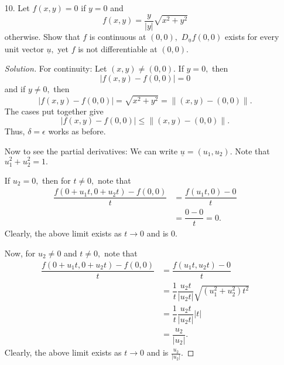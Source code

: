 \documentclass[12pt]{article}
\theoremstyle{definition}
\newenvironment{soln}{\begin{proof}[Solution]}{\end{proof}}
\begin{document}
\begin{itemize}
\begin{soln}
		The above can be written as
		\begin{equation*} 
			|f(x, y) - f(0, 0)| \le \|(x, y) - (0, 0)\|.
		\end{equation*}
		Thus, given any $\epsilon > 0,$ $\delta = \epsilon/\sqrt{2}$ works in the definition of continuity.

		Now, we show neither partial derivative exists. The calculations are similar and we show only the first. For $h \neq 0,$ we note that
		\begin{equation*} 
			\dfrac{f(h, 0) - f(0, 0)}{h} = \dfrac{h\sin(1/h)}{h} = \sin\left(\dfrac{1}{h}\right).
		\end{equation*}
		The limit of the above expression as $h \to 0$ does not exist. Thus, we are done.
	\end{soln}
	\newpage
	\item[10.] Let $f(x, y) = 0$ if $y = 0$ and
	\begin{equation*} 
		f(x, y) = \dfrac{y}{\left|y\right|}\sqrt{x^2 + y^2}
	\end{equation*}
	otherwise. Show that $f$ is continuous at $(0, 0),$ $D_{\underline{u}}f(0, 0)$ exists for every {\color{red}unit} vector $\underline{u},$ yet $f$ is not differentiable at $(0, 0).$
	\begin{soln}
		For continuity: Let $(x, y) \neq (0, 0).$ If $y = 0,$ then\begin{equation*} 
			|f(x, y) - f(0, 0)| = 0
		\end{equation*}
		and if $y \neq 0,$ then
		\begin{equation*} 
			|f(x, y) - f(0, 0)| = \sqrt{x^2 + y^2} = \|(x, y) - (0, 0)\|.
		\end{equation*}
		The cases put together give
		\begin{equation*} 
			|f(x, y) - f(0, 0)| \le \|(x, y) - (0, 0)\|.
		\end{equation*}
		Thus, $\delta = \epsilon$ works as before.

		Now to see the partial derivatives: We can write $\underline{u} = (u_1, u_2).$ Note that $u_1^2 + u_2^2 = 1.$

		If $u_2 = 0,$ then for $t \neq 0,$ note that
		\begin{align*} 
			\dfrac{f(0 + u_1t, 0 + u_2t) - f(0, 0)}{t} &= \dfrac{f(u_1t, 0) - 0}{t}\\
			&= \dfrac{0 - 0}{t} = 0.
		\end{align*}
		Clearly, the above limit exists as $t \to 0$ and is $0.$

		Now, for $u_2 \neq 0$ and $t \neq 0,$ note that
		\begin{align*} 
			\dfrac{f(0 + u_1t, 0 + u_2t) - f(0, 0)}{t} &= \dfrac{f(u_1t, u_2t) - 0}{t}\\
			&=\dfrac{1}{t}\dfrac{u_2t}{\left|u_2t\right|}\sqrt{(u_1^2 + u_2^2)t^2}\\
			&= \dfrac{1}{t}\dfrac{u_2t}{\left|u_2t\right|}\left|t\right|\\
			&= \dfrac{u_2}{\left|u_2\right|}.
		\end{align*}
		Clearly, the above limit exists as $t \to 0$ and is $\frac{u_2}{\left|u_2\right|}.$


\end{soln}
\end{itemize}
\end{document}
